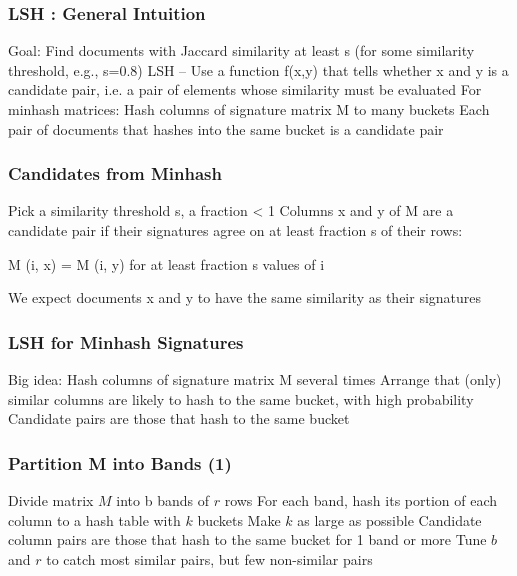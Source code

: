 \documentclass[svgnames]{beamer}
\begin{document}
  
\begin{frame} \frametitle{LSH : General Intuition}

Goal: Find documents with Jaccard similarity at least s (for some similarity threshold, e.g., s=0.8)
LSH -- Use a function f(x,y) that tells whether x and y is a candidate pair, i.e. a pair of elements whose similarity must be evaluated
For minhash matrices:
  Hash columns of signature matrix M to many buckets
  Each pair of documents that hashes into the same bucket is a candidate pair
  
\end{frame}

  
\begin{frame} \frametitle{Candidates from Minhash}

Pick a similarity threshold s, a fraction < 1
Columns x and y of M are a candidate pair if their signatures agree on at least fraction s of their rows: 

M (i, x) = M (i, y) for at least fraction s values of i

We expect documents x and y to have the same similarity as their signatures

\end{frame}

  
\begin{frame} \frametitle{LSH for Minhash Signatures}

Big idea: Hash columns of signature matrix M several times
Arrange that (only) similar columns are likely to hash to the same bucket, with high probability
Candidate pairs are those that hash to the same bucket

\end{frame}

  
\begin{frame} \frametitle{Partition M into Bands (1)}

Divide matrix $M$ into b bands of $r$ rows
For each band, hash its portion of each column to a hash table with $k$ buckets
Make $k$ as large as possible
Candidate column pairs are those that hash to the same bucket for 1 band or more
Tune $b$ and $r$ to catch most similar pairs, but few non-similar pairs

\end{frame}

  
\end{document}
